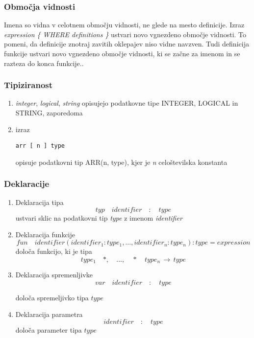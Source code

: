 \documentclass[a4paper, 12pt]{book}
\begin{document}
\subsubsection{Območja vidnosti}

Imena so vidna v celotnem območju vidnosti, ne glede na mesto definicije. Izraz \textit{expression \{ WHERE definitions \}} ustvari novo vgnezdeno območje vidnosti. To pomeni, da definicije znotraj zavitih oklepajev niso vidne navzven. Tudi definicija funkcije ustvari novo vgnezdeno območje vidnosti, ki se začne za imenom in se razteza do konca funkcije..

\subsubsection{Tipiziranost}

\begin{enumerate}
	\item \textit{integer}, \textit{logical}, \textit{string} opisujejo podatkovne tipe INTEGER, LOGICAL in STRING, zaporedoma
	\item izraz 
\begin{lstlisting}[]
	arr [ n ] type
\end{lstlisting}
	opisuje podatkovni tip ARR(n, type), kjer je \textit{n} celoštevilska konstanta 
\end{enumerate}

\subsubsection{Deklaracije}

\begin{enumerate}
	\item Deklaracija tipa
\[
typ\quad  identifier\quad  :\quad  type
\]
	ustvari sklic na podatkovni tip \textit{type} z imenom \textit{identifier}
	\item Deklaracija funkcije
\[ fun\quad identifier  ( identifier_1 : type_1, ..., identifier_n : type_n ) : type = expression \]
	določa funkcijo, ki je tipa \[type_1 \quad *, \quad  ..., \quad *\quad  type_n \,\to\, type \]
	\item Deklaracija spremenljivke
\[
var \quad identifier\quad :\quad type
\]

določa spremeljivko tipa $type$
	\item Deklaracija parametra
\[
identifier \quad :\quad type
\]
določa parameter tipa $type$
\end{enumerate}
\end{document}
